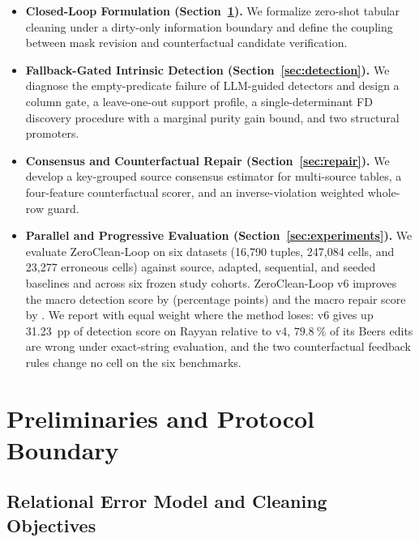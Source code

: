 \documentclass[conference]{IEEEtran}
\begin{document}
\begin{itemize}[leftmargin=*, itemsep=0pt, topsep=1pt]
\item \textbf{Closed-Loop Formulation (Section~\ref{sec:preliminaries}).} We formalize zero-shot tabular cleaning under a dirty-only information boundary and define the coupling between mask revision and counterfactual candidate verification.
\item \textbf{Fallback-Gated Intrinsic Detection (Section~\ref{sec:detection}).} We diagnose the empty-predicate failure of LLM-guided detectors and design a column gate, a leave-one-out support profile, a single-determinant FD discovery procedure with a marginal purity gain bound, and two structural promoters.
\item \textbf{Consensus and Counterfactual Repair (Section~\ref{sec:repair}).} We develop a key-grouped source consensus estimator for multi-source tables, a four-feature counterfactual scorer, and an inverse-violation weighted whole-row guard.
\item \textbf{Parallel and Progressive Evaluation (Section~\ref{sec:experiments}).} We evaluate ZeroClean-Loop on six datasets (16,790 tuples, 247,084 cells, and 23,277 erroneous cells) against source, adapted, sequential, and seeded baselines and across six frozen study cohorts. ZeroClean-Loop v6 improves the macro detection score by \VsixEDGain{} (percentage points) and the macro repair score by \VsixRepairGain{}. We report with equal weight where the method loses: v6 gives up 31.23~pp of detection score on Rayyan relative to v4, $79.8~\%$ of its Beers edits are wrong under exact-string evaluation, and the two counterfactual feedback rules change no cell on the six benchmarks.
\end{itemize}

\section{Preliminaries and Protocol Boundary}
\label{sec:preliminaries}

\subsection{Relational Error Model and Cleaning Objectives}
\label{subsec:prelim_model}
\end{document}
